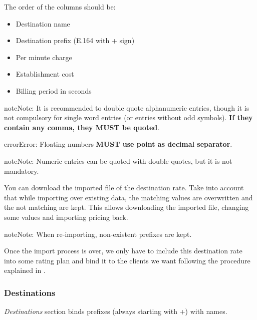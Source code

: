 \documentclass[letterpaper,10pt,english]{sphinxmanual}
\begin{document}
The order of the columns should be:
\begin{itemize}
\item {} 
Destination name

\item {} 
Destination prefix (E.164 with + sign)

\item {} 
Per minute charge

\item {} 
Establishment cost

\item {} 
Billing period in seconds

\end{itemize}

\begin{notice}{note}{Note:}
It is recommended to double quote alphanumeric entries, though
it is not compulsory for single word entries (or entries without odd symbols).
\textbf{If they contain any comma, they MUST be quoted}.
\end{notice}

\begin{notice}{error}{Error:}
Floating numbers \textbf{MUST use point as decimal separator}.
\end{notice}

\begin{notice}{note}{Note:}
Numeric entries can be quoted with double quotes, but it is
not mandatory.
\end{notice}

You can download the imported file of the destination rate. Take into account that while importing
over existing data, the matching values are overwritten and the not matching are kept. This allows
downloading the imported file, changing some values and importing pricing back.

\begin{notice}{note}{Note:}
When re-importing, non-existent prefixes are kept.
\end{notice}

Once the import process is over, we only have to include this destination rate into some
rating plan and bind it to the clients we want following the procedure explained in
{\hyperref[administration_portal/brand/billing/rating_plans:rating\string-plans]{}}.


\subsubsection{Destinations}
\label{administration_portal/brand/billing/destinations::doc}\label{administration_portal/brand/billing/destinations:destinations}
\emph{Destinations} section binds prefixes (always starting with +) with names.
\end{document}
